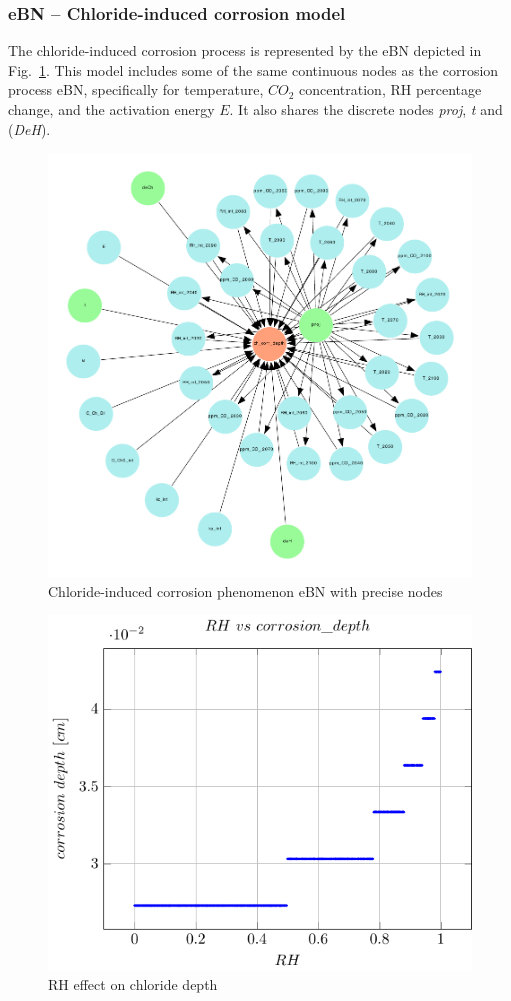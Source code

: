 \subsubsection{eBN -- Chloride-induced corrosion model}
The chloride-induced corrosion process is represented by the eBN depicted in Fig.~\ref{chloride_ebn}. This model includes some of the same continuous nodes as the corrosion process eBN, specifically for temperature, $CO_2$ concentration, RH percentage change, and the activation energy $E$. It also shares the  discrete nodes \textit{proj}, \textit{t} and (\textit{DeH}).
\begin{figure}[H]
    \centering
    \includegraphics[width=\linewidth]{imgs/pdfs/9_chloride_ebn.pdf}
    \caption{Chloride-induced corrosion phenomenon eBN with precise nodes}\label{chloride_ebn}
\end{figure}
\begin{figure}[H]
    \centering
    \includegraphics[width=\linewidth]{imgs/pdfs/11_RH_corr.pdf}
    \caption{RH effect on chloride depth}\label{Chloride vs RH}
\end{figure}
